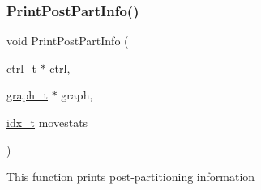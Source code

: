 \mbox{\label{a00969_a6f0fa911c3fe611186b0233e2bb19555}} 
\subsubsection{\texorpdfstring{Print\+Post\+Part\+Info()}{PrintPostPartInfo()}}
{\footnotesize\ttfamily void Print\+Post\+Part\+Info (\begin{DoxyParamCaption}\item[{\hyperlink{a00742}{ctrl\+\_\+t} $\ast$}]{ctrl,  }\item[{\hyperlink{a00734}{graph\+\_\+t} $\ast$}]{graph,  }\item[{\hyperlink{a00876_aaa5262be3e700770163401acb0150f52}{idx\+\_\+t}}]{movestats }\end{DoxyParamCaption})}

This function prints post-\/partitioning information 